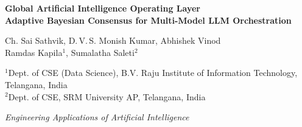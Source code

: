 \documentclass[14pt]{article}
\begin{document}
\pagestyle{empty}

\begin{center}
\vspace{0.4cm}
{\Huge\bfseries Global Artificial Intelligence Operating Layer}\\[0.35em]
{\LARGE\bfseries Adaptive Bayesian Consensus for Multi-Model LLM Orchestration}
\vspace{0.5cm}

{\Large Ch. Sai Sathvik, D.\,V.\,S. Monish Kumar, Abhishek Vinod\\
Ramdas Kapila$^{1}$, Sumalatha Saleti$^{2}$}
\vspace{0.25cm}

{\large
$^{1}$Dept. of CSE (Data Science), B.V. Raju Institute of Information Technology, Telangana, India\\
$^{2}$Dept. of CSE, SRM University AP, Telangana, India}
\vspace{0.25cm}

{\normalsize \textit{Engineering Applications of Artificial Intelligence}}
\vspace{0.5cm}
\end{center}
\end{document}

